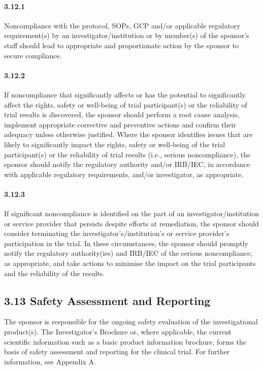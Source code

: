 \documentclass[11pt]{article}
\begin{document}
\paragraph{3.12.1} Noncompliance with the protocol, SOPs, GCP and/or applicable regulatory requirement(s) by an investigator/institution or by member(s) of the sponsor's staff should lead to appropriate and proportionate action by the sponsor to secure compliance.

\paragraph{3.12.2} If noncompliance that significantly affects or has the potential to significantly affect the rights, safety or well-being of trial participant(s) or the reliability of trial results is discovered, the sponsor should perform a root cause analysis, implement appropriate corrective and preventive actions and confirm their adequacy unless otherwise justified. Where the sponsor identifies issues that are likely to significantly impact the rights, safety or well-being of the trial participant(s) or the reliability of trial results (i.e., serious noncompliance), the sponsor should notify the regulatory authority and/or IRB/IEC, in accordance with applicable regulatory requirements, and/or investigator, as appropriate.

\paragraph{3.12.3} If significant noncompliance is identified on the part of an investigator/institution or service provider that persists despite efforts at remediation, the sponsor should consider terminating the investigator's/institution's or service provider's participation in the trial. In these circumstances, the sponsor should promptly notify the regulatory authority(ies) and IRB/IEC of the serious noncompliance, as appropriate, and take actions to minimise the impact on the trial participants and the reliability of the results.

\subsection{3.13 Safety Assessment and Reporting}

The sponsor is responsible for the ongoing safety evaluation of the investigational product(s). The Investigator's Brochure or, where applicable, the current scientific information such as a basic product information brochure, forms the basis of safety assessment and reporting for the clinical trial. For further information, see Appendix A.
\end{document}

